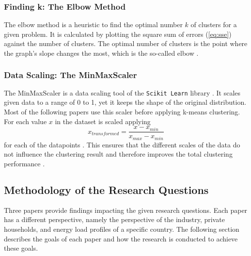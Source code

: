 \subsubsection{Finding k: The Elbow Method}
The elbow method is a heuristic to find the optimal number $k$ of clusters for a given problem.
It is calculated by plotting the square sum of errors (\ref{eq:sse}) against the number of clusters.
The optimal number of clusters is the point where the graph's slope changes the most, which is the so-called elbow \cite{SYA-IKC}.

\subsubsection{Data Scaling: The MinMaxScaler}
The MinMaxScaler is a data scaling tool of the \texttt{Scikit Learn} library \cite{SKL-MMS}.
It scales given data to a range of 0 to 1, yet it keeps the shape of the original distribution.
Most of the following papers use this scaler before applying k-means clustering.
For each value $x$ in the dataset is scaled applying \begin{equation}\label{eq:minmaxscaler} 
      x_{transformed} = \frac{x - x_{min}}{x_{max} - x_{min}}
\end{equation} for each of the datapoints \cite{JOJ-ENP}.
This ensures that the different scales of the data do not influence the clustering result and therefore improves the total clustering performance \cite{GOG-WSI}.


\subsection{Methodology of the Research Questions}
\label{sec:methodology_of_the_research_questions}
Three papers provide findings impacting the given research questions.
Each paper has a different perspective, namely the perspective of the industry, private households, and energy load profiles of a specific country.
The following section describes the goals of each paper and how the research is conducted to achieve these goals.

